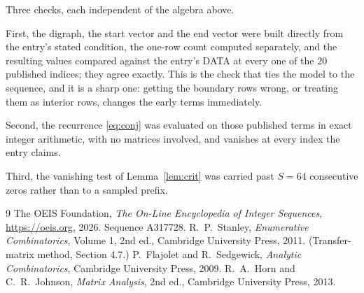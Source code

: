 \documentclass[11pt,a4paper]{article}
\theoremstyle{plain}
\theoremstyle{definition}
\begin{document}
Three checks, each independent of the algebra above.

First, the digraph, the start vector and the end vector were built directly from the
entry's stated condition, the one-row count computed separately, and the resulting values
compared against the entry's DATA at every one of the $20$ published indices; they
agree exactly. This is the check that ties the model to the sequence, and it is a sharp one:
getting the boundary rows wrong, or treating them as interior rows, changes the early terms
immediately.

Second, the recurrence \eqref{eq:conj} was evaluated on those published terms in exact
integer arithmetic, with no matrices involved, and vanishes at every index the entry claims.

Third, the vanishing test of Lemma~\ref{lem:crit} was carried past $S=64$ consecutive
zeros rather than to a sampled prefix.

\begin{thebibliography}{9}
 The OEIS Foundation, \emph{The On-Line Encyclopedia of Integer
Sequences}, \url{https://oeis.org}, 2026. Sequence A317728.
 R.~P.~Stanley, \emph{Enumerative Combinatorics}, Volume 1, 2nd ed.,
Cambridge University Press, 2011. (Transfer-matrix method, Section 4.7.)
 P.~Flajolet and R.~Sedgewick, \emph{Analytic Combinatorics}, Cambridge
University Press, 2009.
 R.~A.~Horn and C.~R.~Johnson, \emph{Matrix Analysis}, 2nd ed., Cambridge
University Press, 2013.
\end{thebibliography}
\end{document}
